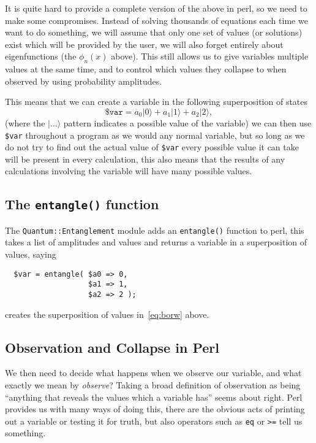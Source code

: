 \documentclass{article}      %
\newcommand{\pvar}[1]{\texttt{\$#1}} %
\newcommand{\ptt}[1]{\texttt{#1}}    %
\begin{document}
It is quite hard to provide a complete version of the above in perl,
so we need to make some compromises.  Instead of solving thousands of
equations each time we want to do something, we will assume that only
one set of values (or solutions) exist which will be provided by the
user, we will also forget entirely about
eigenfunctions (the $\phi_n(x)$ above).  This still allows us to give
variables multiple values at the same time, and to control which values
they collapse to when observed by using probability amplitudes.

This means that we can create a variable in the following
superposition of states
\begin{equation}
	\pvar{var} =    a_0|0 \rangle +
			a_1|1 \rangle +
			a_2|2 \rangle,
\label{eq:borw}
\end{equation}
(where the $| \ldots \rangle$ pattern indicates a possible value of
the variable) we can then use \pvar{var} throughout a program as we
would any normal variable, but so long as we do not try to find out
the actual value of \pvar{var} every possible value it can take will
be present in every calculation, this also means that the results of
any calculations involving the variable will have many possible values.

\subsection{The \ptt{entangle()} function}

The \ptt{Quantum::Entanglement} module adds an \ptt{entangle()}
function to perl, this takes a list of amplitudes and values and
returns a variable in a superposition of values, saying
\begin{verbatim}
  $var = entangle( $a0 => 0,
                   $a1 => 1,
                   $a2 => 2 );
\end{verbatim} %
creates the superposition of values in~\ref{eq:borw} above.

\subsection{Observation and Collapse in Perl}

We then need to decide what happens when we observe our variable, and
what exactly we mean by \emph{observe}?  Taking a broad
definition of observation as being ``anything that reveals the values
which a variable has'' seems about right.  Perl
provides us with many ways of doing this, there are the obvious acts
of printing out a variable or testing it for truth, but also operators
such as \ptt{eq} or \ptt{>=} tell us something.
\end{document}
